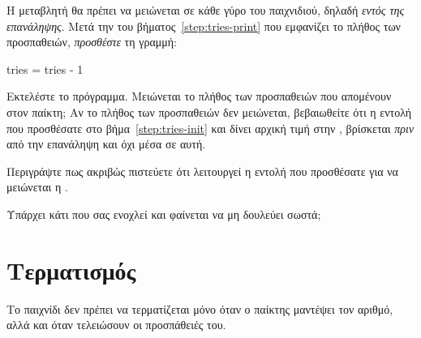 \documentclass[a4paper,11pt,oneside]{book}
\begin{document}
\begin{step}
Η μεταβλητή  θα πρέπει να μειώνεται σε κάθε γύρο του παιχνιδιού, δηλαδή \emph{εντός της επανάληψης}. Μετά την  του βήματος~\ref{step:tries-print} που εμφανίζει το πλήθος των προσπαθειών, \emph{προσθέστε} τη γραμμή:

\begin{pynew}
    tries = tries - 1
\end{pynew}

Εκτελέστε το πρόγραμμα. Μειώνεται το πλήθος των προσπαθειών που απομένουν στον παίκτη;
\marginnote[14pt]{\iconcaution}
Αν το πλήθος των προσπαθειών δεν μειώνεται, βεβαιωθείτε ότι η εντολή που προσθέσατε στο βήμα~\ref{step:tries-init} και δίνει αρχική τιμή στην , βρίσκεται \emph{πριν} από την επανάληψη και όχι μέσα σε αυτή.

Περιγράψτε πως ακριβώς πιστεύετε ότι λειτουργεί η εντολή που προσθέσατε για να μειώνεται η .

\marginnote[14pt]{\icondiscuss}
\dottedline

\dottedline



Υπάρχει κάτι που σας ενοχλεί και φαίνεται να μη δουλεύει σωστά;

\marginnote[14pt]{\icondiscuss}
\dottedline
\end{step}
 
\section{Τερματισμός}

Το παιχνίδι δεν πρέπει να τερματίζεται μόνο όταν ο παίκτης μαντέψει τον αριθμό, αλλά και όταν τελειώσουν οι προσπάθειές του.
\end{document}
